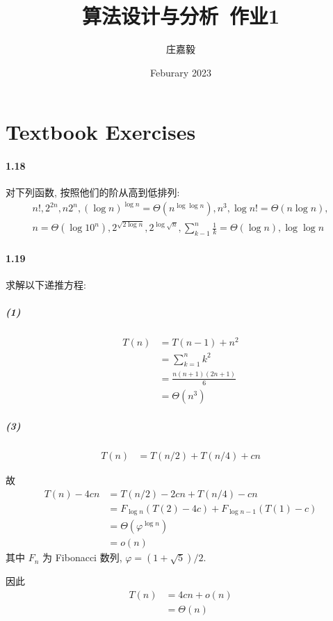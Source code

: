 \documentclass{ctexart}
\title{算法设计与分析~作业1}
\author{庄嘉毅}
\date{Feburary 2023}
\begin{document}
\maketitle

\section{Textbook Exercises}

\paragraph*{1.18} 对下列函数, 按照他们的阶从高到低排列:
\begin{gather*}
    n!, 2^{2n}, n2^n, (\log n)^{\log n}=\Theta(n^{\log\log n}), n^3, \log n!=\Theta(n\log n), \\
    n=\Theta(\log 10^n), 2^{\sqrt{2\log n}}, 2^{\log \sqrt{n}}, \sum_{k-1}^n \frac{1}{k}=\Theta(\log n), \log\log n
\end{gather*}

\paragraph*{1.19} 求解以下递推方程:

\subparagraph*{(1)} \begin{align*}
    T(n) & = T(n-1) + n^2           \\
         & = \sum_{k=1}^n k^2       \\
         & = \frac{n(n+1)(2n+1)}{6} \\
         & = \Theta(n^3)
\end{align*}

\subparagraph*{(3)} \begin{align*}
    T(n) & = T(n/2) + T(n/4) + cn
\end{align*}

故
\begin{align*}
    T(n) - 4cn & = T(n/2) - 2cn + T(n/4) - cn                  \\
               & = F_{\log n}(T(2)-4c) + F_{\log n -1}(T(1)-c) \\
               & = \Theta(\varphi^{\log n})                    \\
               & = o(n)
\end{align*}
其中 $F_n$ 为 Fibonacci 数列, $\varphi=(1+\sqrt{5})/2 $.

因此
\begin{align*}
    T(n) & = 4cn + o(n) \\
         & =\Theta(n)
\end{align*}
\end{document}
